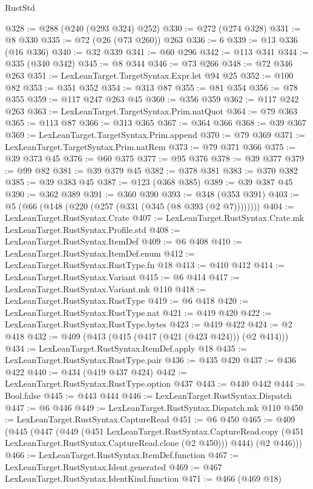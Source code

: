 \begin{lexlean}{RustStd}
\begin{coremodule}
{\begin{coremodule}
{{{{{{{{{{{@328 := @288 (@240 (@293 @324) @252)
@330 := @272 (@274 @328)
@331 := @8 @330
@335 := @72 (@26 (@73 @260)) @263
@336 := 6
@339 := @13 @336 (@16 @336)
@340 := @32 @339
@341 := @60 @296
@342 := @113 @341
@344 := @335 (@340 @342)
@345 := @8 @344
@346 := @73 @266
@348 := @72 @346 @263
@351 := LexLeanTarget.TargetSyntax.Expr.let @94 @25
@352 := @100 @82
@353 := @351 @352
@354 := @313 @87
@355 := @81 @354
@356 := @78 @355
@359 := @117 @247 @263 @45
@360 := @356 @359
@362 := @117 @242 @263
@363 := LexLeanTarget.TargetSyntax.Prim.natQuot
@364 := @79 @363
@365 := @113 @87
@366 := @313 @365
@367 := @364 @366
@368 := @39 @367
@369 := LexLeanTarget.TargetSyntax.Prim.append
@370 := @79 @369
@371 := LexLeanTarget.TargetSyntax.Prim.natRem
@373 := @79 @371 @366
@375 := @39 @373 @45
@376 := @60 @375
@377 := @95 @376
@378 := @39 @377
@379 := @99 @82
@381 := @39 @379 @45
@382 := @378 @381
@383 := @370 @382
@385 := @39 @383 @45
@387 := @123 (@368 @385)
@389 := @39 @387 @45
@390 := @362 @389
@391 := @360 @390
@393 := @348 (@353 @391)
@403 := @5 (@66 (@148 (@220 (@257 (@331 (@345 (@8 @393 (@2 @7))))))))
@404 := LexLeanTarget.RustSyntax.Crate
@407 := LexLeanTarget.RustSyntax.Crate.mk LexLeanTarget.RustSyntax.Profile.std
@408 := LexLeanTarget.RustSyntax.ItemDef
@409 := @6 @408
@410 := LexLeanTarget.RustSyntax.ItemDef.enum
@412 := LexLeanTarget.RustSyntax.RustType.fn @18
@413 := @410 @412
@414 := LexLeanTarget.RustSyntax.Variant
@415 := @6 @414
@417 := LexLeanTarget.RustSyntax.Variant.mk @110
@418 := LexLeanTarget.RustSyntax.RustType
@419 := @6 @418
@420 := LexLeanTarget.RustSyntax.RustType.nat
@421 := @419 @420
@422 := LexLeanTarget.RustSyntax.RustType.bytes
@423 := @419 @422
@424 := @2 @418
@432 := @409 (@413 (@415 (@417 (@421 (@423 @424))) (@2 @414)))
@434 := LexLeanTarget.RustSyntax.ItemDef.apply @18
@435 := LexLeanTarget.RustSyntax.RustType.pair
@436 := @435 @420
@437 := @436 @422
@440 := @434 (@419 @437 @424)
@442 := LexLeanTarget.RustSyntax.RustType.option @437
@443 := @440 @442
@444 := Bool.false
@445 := @443 @444
@446 := LexLeanTarget.RustSyntax.Dispatch
@447 := @6 @446
@449 := LexLeanTarget.RustSyntax.Dispatch.mk @110
@450 := LexLeanTarget.RustSyntax.CaptureRead
@451 := @6 @450
@465 := @409
    (@445
      (@447
        (@449
          (@451
            LexLeanTarget.RustSyntax.CaptureRead.copy
            (@451 LexLeanTarget.RustSyntax.CaptureRead.clone (@2 @450)))
          @444)
        (@2 @446)))
@466 := LexLeanTarget.RustSyntax.ItemDef.function
@467 := LexLeanTarget.RustSyntax.Ident.generated
@469 := @467 LexLeanTarget.RustSyntax.IdentKind.function
@471 := @466 (@469 @18)
}}}}}}}}}}}
\end{coremodule}}
\end{coremodule}
\end{lexlean}
